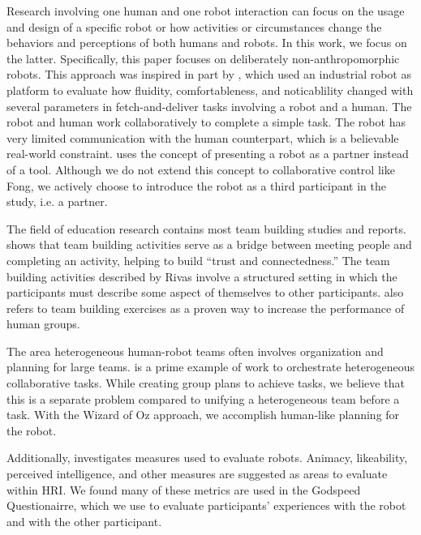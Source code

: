 \documentclass{acm_proc_article-sp}
\begin{document}
Research involving one human and one robot interaction can focus on the usage and design of a specific robot or how activities or circumstances change the behaviors and perceptions of both humans and robots. In this work, we focus on the latter. Specifically, this paper focuses on deliberately non-anthropomorphic robots. This approach was inspired in part by \cite{Unhelkar}, which used an industrial robot as platform to evaluate how fluidity, comfortableness, and noticablility changed with several parameters in fetch-and-deliver tasks involving a robot and a human. The robot and human work collaboratively to complete a simple task. The robot has very limited communication with the human counterpart, which is a believable real-world constraint.
\cite{Fong} uses the concept of presenting a robot as a partner instead of a tool. Although we do not extend this concept to collaborative control like Fong, we actively choose to introduce the robot as a third participant in the study, i.e. a partner.

The field of education research contains most team building studies and reports. \cite{Rivas} shows that team building activities serve as a bridge between meeting people and completing an activity, helping to build ``trust and connectedness.'' The team building activities described by Rivas involve a structured setting in which the participants must describe some aspect of themselves to other participants. \cite{Dyer} also refers to team building exercises as a proven way to increase the performance of human groups.

The area heterogeneous human-robot teams often involves organization and planning for large teams. \cite{Ponda} is a prime example of work to orchestrate heterogeneous collaborative tasks. While creating group plans to achieve tasks, we believe that this is a separate problem compared to unifying a heterogeneous team before a task. With the Wizard of Oz approach, we accomplish human-like planning for the robot. 

Additionally, \cite{Godspeed} investigates measures used to evaluate robots. Animacy, likeability, perceived intelligence, and other measures are suggested as areas to evaluate within HRI. We found many of these metrics are used in the Godspeed Questionairre, which we use to evaluate participants' experiences with the robot and with the other participant.
\end{document}
